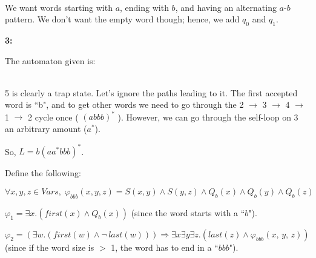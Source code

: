 \documentclass{article}
\begin{document}
\begin{flushleft}
\\
We want words starting with $a$, ending with $b$, and having an alternating $a$-$b$ pattern. We don't want the empty word though; hence, we add $q_0$ and $q_1$.

\textbf{3:}

The automaton given is:\vspace{3mm}

\\
5 is clearly a trap state. Let's ignore the paths leading to it. The first accepted word is ``b", and to get other words we need to go through the 2 $\rightarrow$ 3 $\rightarrow$ 4 $\rightarrow$ 1 $\rightarrow$ 2 cycle once ( $(abbb)^*$ ). However, we can go through the self-loop on 3 an arbitrary amount ($a^*$).

So, $L = b(a a^* bbb)^*$.

Define the following:

$\forall x, y, z \in Vars,\;\varphi_{bbb}(x, y, z) = S(x, y) \land S(y, z) \land Q_b(x) \land Q_b(y) \land Q_b(z)$

$\varphi_1 = \exists x.(first(x) \land Q_b(x))$ (since the word starts with a ``$b$").

$\varphi_2 = (\exists w.(first(w) \land \neg\, last(w))) \Rightarrow \exists x \exists y \exists z.(last(z) \land \varphi_{bbb}(x,\, y,\, z))$ (since if the word size is $>$ 1, the word has to end in a ``$bbb$").


\end{flushleft}
\end{document}
